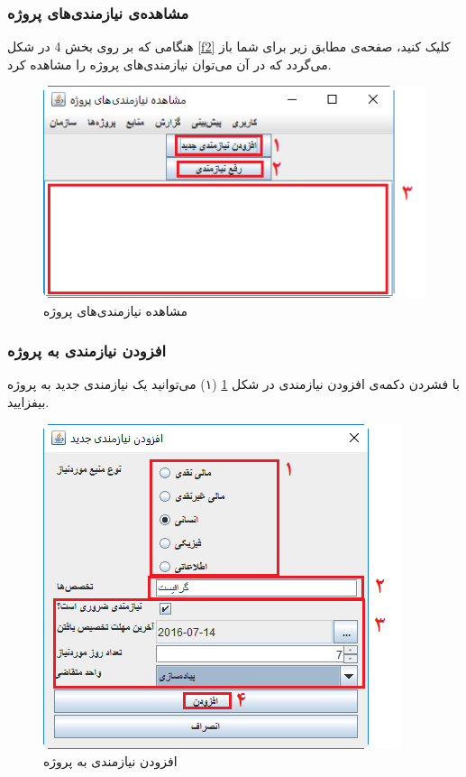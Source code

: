 \subsubsection{مشاهده‌ی نیازمندی‌های پروژه}

هنگامی که بر روی بخش 4 در شکل
\ref{f2}
کلیک کنید، صفحه‌ی مطابق زیر برای شما باز می‌گردد که در آن می‌توان نیازمندی‌های پروژه را مشاهده کرد.

\begin{figure}[H]
	\centering
	\includegraphics[scale=0.7]{img/manual/viewPrjReqs}
	\caption{مشاهده نیازمندی‌های پروژه}
	\label{f102}
\end{figure}

\subsubsection{افزودن نیازمندی به پروژه}
با فشردن دکمه‌ی افزودن نیازمندی  در شکل 
\ref{f102}
(۱) می‌توانید یک نیازمندی جدید به پروژه بیفزایید.

\begin{figure}[H]
	\centering
	\includegraphics[scale=0.7]{img/manual/addReqToPrj}
	\caption{افزودن نیازمندی به پروژه}
	\label{f5}
\end{figure}

